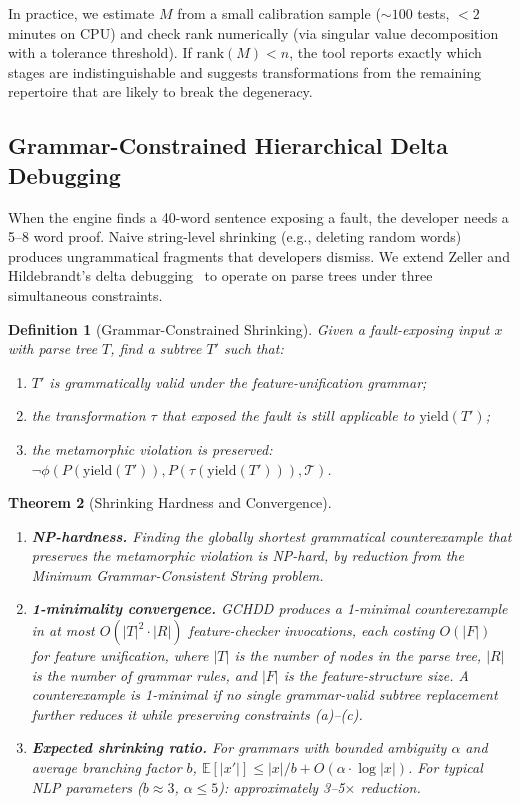 \documentclass[sigconf,nonacm]{acmart}
\newtheorem{theorem}{Theorem}
\newtheorem{definition}[theorem]{Definition}
\begin{document}
In practice, we estimate $M$ from a small calibration sample (${\sim}100$ tests, $<2$ minutes on CPU) and check rank numerically (via singular value decomposition with a tolerance threshold).
If $\mathrm{rank}(M) < n$, the tool reports exactly which stages are indistinguishable and suggests transformations from the remaining repertoire that are likely to break the degeneracy.

\subsection{Grammar-Constrained Hierarchical Delta Debugging}\label{sec:shrinking}

When the engine finds a 40-word sentence exposing a fault, the developer needs a 5--8 word proof.
Naive string-level shrinking (e.g., deleting random words) produces ungrammatical fragments that developers dismiss.
We extend Zeller and Hildebrandt's delta debugging~\cite{zeller2002simplifying} to operate on parse trees under three simultaneous constraints.

\begin{definition}[Grammar-Constrained Shrinking]
Given a fault-exposing input $x$ with parse tree $T$, find a subtree $T'$ such that:
\begin{enumerate}
    \item[(a)] $T'$ is grammatically valid under the feature-unification grammar;
    \item[(b)] the transformation $\tau$ that exposed the fault is still applicable to $\mathrm{yield}(T')$;
    \item[(c)] the metamorphic violation is preserved: $\neg\phi(P(\mathrm{yield}(T')), P(\tau(\mathrm{yield}(T'))), \mathcal{T})$.
\end{enumerate}
\end{definition}

\begin{theorem}[Shrinking Hardness and Convergence]\label{thm:shrinking}
\leavevmode
\begin{enumerate}
    \item[\textbf{(a)}] \textbf{NP-hardness.} Finding the globally shortest grammatical counterexample that preserves the metamorphic violation is NP-hard, by reduction from the Minimum Grammar-Consistent String problem.
    \item[\textbf{(b)}] \textbf{1-minimality convergence.} GCHDD produces a 1-minimal counterexample in at most $O(|T|^2 \cdot |R|)$ feature-checker invocations, each costing $O(|F|)$ for feature unification, where $|T|$ is the number of nodes in the parse tree, $|R|$ is the number of grammar rules, and $|F|$ is the feature-structure size.
    A counterexample is 1-minimal if no single grammar-valid subtree replacement further reduces it while preserving constraints (a)--(c).
    \item[\textbf{(c)}] \textbf{Expected shrinking ratio.} For grammars with bounded ambiguity $\alpha$ and average branching factor $b$, $\mathbb{E}[|x'|] \leq |x|/b + O(\alpha \cdot \log|x|)$.
    For typical NLP parameters ($b \approx 3$, $\alpha \leq 5$): approximately 3--5$\times$ reduction.
\end{enumerate}
\end{theorem}
\end{document}
